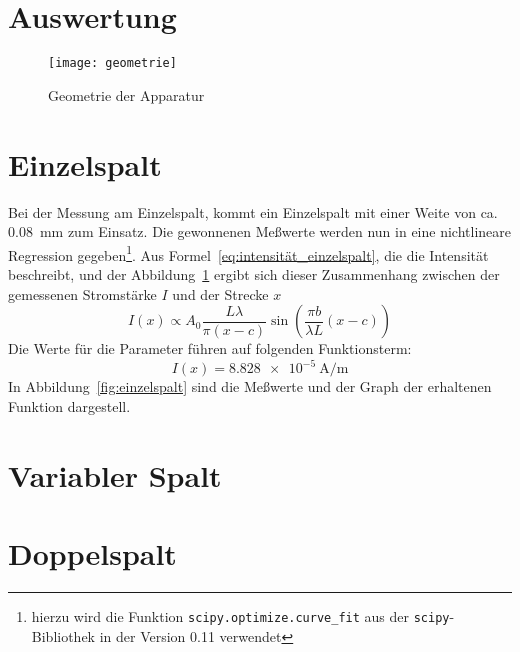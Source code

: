 \section{Auswertung}

\begin{figure}
  \centering
  \texttt{[image: geometrie]}
  \caption{Geometrie der Apparatur}
  \label{fig:apparatur-geometrie}
\end{figure}

\section{Einzelspalt}
Bei der Messung am Einzelspalt, kommt ein Einzelspalt mit einer Weite
von ca. \SI{0.08}{\milli\metre} zum Einsatz. Die gewonnenen Meßwerte
werden nun in eine nichtlineare Regression gegeben\footnote{hierzu wird
  die Funktion \texttt{scipy.optimize.curve\_fit} aus der
  \texttt{scipy}-Bibliothek in der Version 0.11 verwendet}. Aus
Formel~\eqref{eq:intensität_einzelspalt}, die die Intensität beschreibt,
und der Abbildung~\ref{fig:apparatur-geometrie} ergibt sich dieser
Zusammenhang zwischen der gemessenen Stromstärke $I$ und der Strecke $x$
%
\begin{equation}
  \label{eq:strom-einzelspalt}
  I(x) \propto A_0\frac{L\lambda}{\pi(x-c)} \sin\left(\frac{\pi b}{\lambda
        L} (x-c)\right)
\end{equation}
%
Die Werte für die Parameter führen auf folgenden Funktionsterm:
%
\begin{equation}
  \label{eq:einzelspalt_fit}
  I(x) = \SI[exponent-to-prefix = true]{8.828e-5}{\ampere\per\metre}
\end{equation}
%
In Abbildung~\ref{fig:einzelspalt} sind die Meßwerte und der Graph der
erhaltenen Funktion dargestell.

\section{Variabler Spalt}

\section{Doppelspalt}
